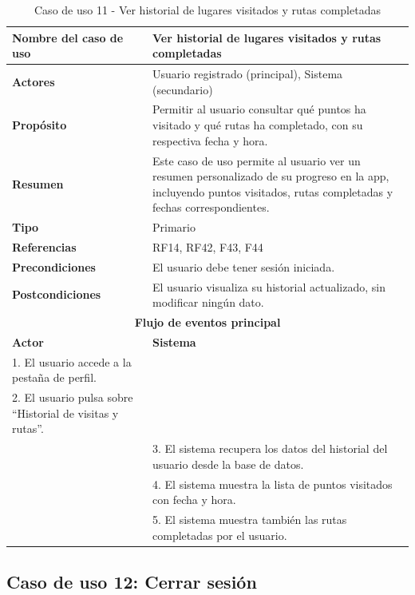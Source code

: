 \begin{table}[H]
\centering
\caption{Caso de uso 11 - Ver historial de lugares visitados y rutas completadas}
\begin{tabular}{|p{4.5cm}|p{10.5cm}|}
\hline
\textbf{Nombre del caso de uso} & Ver historial de lugares visitados y rutas completadas \\
\hline
\textbf{Actores} & Usuario registrado (principal), Sistema (secundario) \\
\hline
\textbf{Propósito} & Permitir al usuario consultar qué puntos ha visitado y qué rutas ha completado, con su respectiva fecha y hora. \\
\hline
\textbf{Resumen} & Este caso de uso permite al usuario ver un resumen personalizado de su progreso en la app, incluyendo puntos visitados, rutas completadas y fechas correspondientes. \\
\hline
\textbf{Tipo} & Primario \\
\hline
\textbf{Referencias} & RF14, RF42, F43, F44 \\
\hline
\textbf{Precondiciones} & El usuario debe tener sesión iniciada. \\
\hline
\textbf{Postcondiciones} & El usuario visualiza su historial actualizado, sin modificar ningún dato. \\
\hline
\multicolumn{2}{|c|}{\textbf{Flujo de eventos principal}} \\
\hline
\textbf{Actor} & \textbf{Sistema} \\
\hline
1. El usuario accede a la pestaña de perfil. & \\
\hline
2. El usuario pulsa sobre “Historial de visitas y rutas”. & \\
\hline
& 3. El sistema recupera los datos del historial del usuario desde la base de datos. \\
\hline
& 4. El sistema muestra la lista de puntos visitados con fecha y hora. \\
\hline
& 5. El sistema muestra también las rutas completadas por el usuario. \\
\hline
\end{tabular}
\end{table}


\subsection{Caso de uso 12: Cerrar sesión}

